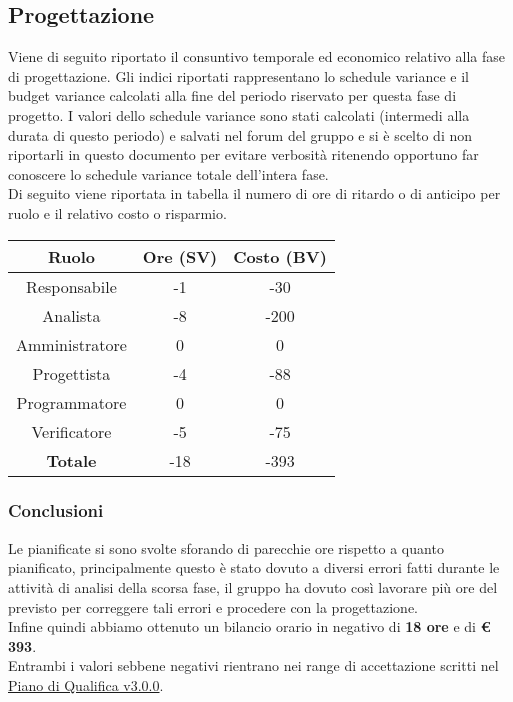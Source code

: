 \documentclass{scalatekids-article}
\begin{document}
\subsection{Progettazione}
Viene di seguito riportato il consuntivo temporale ed economico relativo alla fase di progettazione. Gli indici riportati rappresentano lo schedule variance e il budget variance calcolati alla fine del periodo riservato per questa fase di progetto. I valori dello schedule variance sono stati calcolati (intermedi alla durata di questo periodo) e salvati nel forum del gruppo e si è scelto di non riportarli in questo documento per evitare verbosità ritenendo opportuno far conoscere lo schedule variance totale dell'intera fase.\\
Di seguito viene riportata in tabella il numero di ore di ritardo o di anticipo per ruolo e il relativo costo o risparmio.
\begin{center}
  \normalsize
  \begin{tabular}{| c | c | c |}
    \hline
    \textbf{Ruolo} & \textbf{Ore (SV)} & \textbf{Costo (BV)}\\
    \hline
    Responsabile & -1 & -30 \\
    Analista & -8 & -200\\
    Amministratore & 0 & 0\\
    Progettista & -4 & -88\\
    Programmatore & 0 & 0\\
    Verificatore & -5 & -75\\
    \hline
    \textbf{Totale} & -18 & -393\\
    \hline
  \end{tabular}
\end{center}

\subsubsection{Conclusioni}
Le  pianificate si sono svolte sforando di parecchie ore rispetto a quanto pianificato, principalmente questo è stato dovuto a diversi errori fatti durante le attività di analisi della scorsa fase, il gruppo ha dovuto così lavorare più ore del previsto per correggere tali errori e procedere con la progettazione.\\Infine quindi abbiamo ottenuto un bilancio orario in negativo di \textbf{18 ore} e di \textbf{\euro{} 393}.\\ Entrambi i valori sebbene negativi rientrano nei range di accettazione scritti nel \href{run:PianoDiQualifica\_v3.0.0.pdf}{Piano di Qualifica v3.0.0}.
\end{document}
